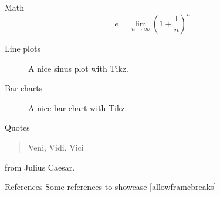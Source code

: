 		\begin{frame}{Math}
			\begin{equation}
				e = \lim_{n\to \infty} \left(1 + \frac{1}{n}\right)^n
			\end{equation}
		\end{frame}
		
		\begin{frame}{Line plots}
			\begin{figure}
				\centering
				\caption{A nice sinus plot with Tikz.}
			\end{figure}
		\end{frame}
		
		\begin{frame}{Bar charts}
			\begin{figure}
				\centering
				\caption{A nice bar chart with Tikz.}
			\end{figure}
		\end{frame}
		
		\begin{frame}{Quotes}
			\begin{quote}
				Veni, Vidi, Vici
			\end{quote}
			from Julius Caesar.
		\end{frame}
			
		\begin{frame}{References}
			Some references to showcase [allowframebreaks] \cite{Knuth92,ConcreteMath,Simpson,Er01,greenwade93}
		\end{frame}
	
